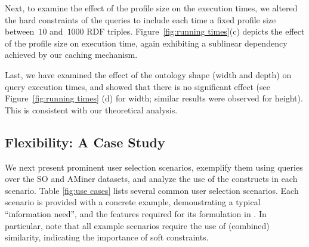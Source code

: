 
Next, to examine the effect of the profile size on the execution times, we altered the hard constraints of the queries to include each time a fixed profile size between~$10$ and~$1000$ RDF triples. Figure~\ref{fig:running times}(c) depicts the effect of the profile size on execution time, again exhibiting a sublinear dependency achieved by our caching mechanism.%

Last, we have examined the effect of the ontology shape (width and depth) on query execution times, and showed that there is no significant effect (see Figure~\ref{fig:running times} (d) for width; similar results were observed for height). This is consistent with our theoretical analysis.



\subsection{Flexibility: A Case Study}
\label{sec:flexibility}


We next present prominent user selection scenarios, exemplify them using queries over the SO and AMiner datasets, and analyze the use of the \qlang{} constructs in each scenario. Table \ref{fig:use cases} lists several common user selection scenarios. Each scenario is provided with a concrete example, demonstrating a typical ``information need'', and
the features required for its formulation in \qlang{}. In particular, note that all example scenarios require the use of (combined) similarity, indicating the importance of soft constraints.  


